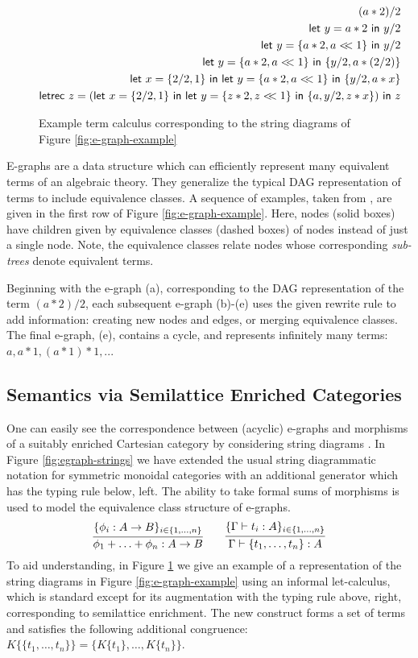\begin{figure}\label{fig:let-calculus}
\begin{align*}
    (a*2)/2 \\
    \mylet{y}{a*2} y/2 \\ 
    \mylet{y}{\{a*2,a<\!\!<1\}} y/2 \\
    \mylet{y}{\{a*2,a<\!\!<1\}} \{y/2, a*(2/2)\} \\
    \mylet{x}{\{2/2, 1\}} \mylet{y}{\{a*2, a <\!\!< 1\}} \{y/2, a*x\} \\
    \textsf{letrec } z = (\mylet{x}{\{2/2, 1\}} \mylet{y}{\{z*2, z <\!\!< 1\}} \{a, y/2, z*x\}) \textsf{ in } z
\end{align*}
\caption{Example term calculus corresponding to the string diagrams of Figure \ref{fig:e-graph-example}}
\end{figure}

E-graphs are a data structure which can efficiently represent many equivalent terms of an algebraic theory.  They generalize the typical DAG representation of terms to include equivalence classes. 
A sequence of examples, taken from \cite{EggPaper}, are given in the first row of Figure \ref{fig:e-graph-example}. Here,  nodes (solid boxes) have children given by equivalence classes (dashed boxes) of nodes instead of just a single node.  Note, the equivalence classes relate nodes whose corresponding \textit{sub-trees} denote equivalent terms. 

Beginning with the e-graph (a), corresponding to the DAG representation of the term $(a*2)/2$, each subsequent e-graph (b)-(e) uses the given rewrite rule to add information: creating new nodes and edges, or merging equivalence classes. The final e-graph, (e), contains a cycle, and represents infinitely many terms: $a, a*1, (a*1)*1, $... 

\subsection*{Semantics via Semilattice Enriched Categories}

One can easily see the correspondence between (acyclic) e-graphs and morphisms of a suitably enriched Cartesian category by considering string diagrams 
\cite{noauthor_09083347_nodate,joyal_geometry_1991, mellies_functorial_2006}. In Figure \ref{fig:egraph-strings} we have extended the usual string diagrammatic notation for symmetric monoidal categories with an additional generator which has the  typing rule below, left.
The ability to take formal sums of morphisms is used to model the equivalence class structure of e-graphs.  
\[
\infer{\phi_1 + \ldots + \phi_n: A \to B}{\{\phi_i: A \to B\}_{i \in \{1,\ldots,n\}}}
\qquad
\infer{\Gamma \vdash \{t_1, \ldots, t_n\}: A}{\{\Gamma \vdash t_i: A\}_{i \in \{1, \ldots, n\}}}
\]
To aid understanding, in Figure \ref{fig:let-calculus} we give an example of a representation of the string diagrams in Figure \ref{fig:e-graph-example} using an informal let-calculus, which is standard except for its augmentation with the typing rule above, right, corresponding to semilattice enrichment. The new construct forms a set of terms and satisfies the following additional congruence: $K\{\{t_1, \ldots, t_n\}\} = \{K\{t_1\}, \ldots, K\{t_n\}\}$. 

